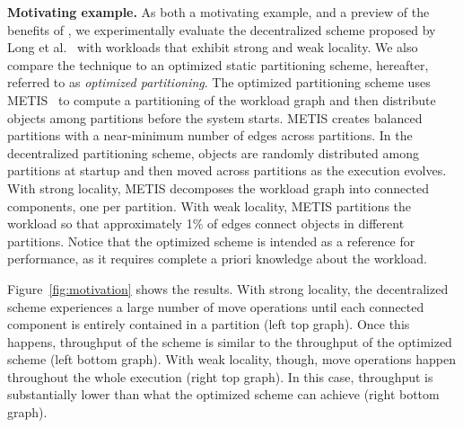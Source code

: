

\noindent
\textbf{Motivating example.}
As both a motivating example, and a preview of the benefits of
\dynastar, we experimentally evaluate the decentralized scheme
proposed by Long et al.~\cite{hoang2016} with workloads that exhibit
strong and weak locality.  We also compare the technique to an
optimized static partitioning scheme, hereafter, referred to as
\emph{optimized partitioning}.  The optimized partitioning scheme uses
METIS~\cite{Abou-Rjeili:2006} to compute a partitioning of the
workload graph and then distribute objects among partitions before the
system starts.  METIS creates balanced partitions with a near-minimum
number of edges across partitions.  In the decentralized partitioning
scheme, objects are randomly distributed among partitions at startup
and then moved across partitions as the execution evolves.  With
strong locality, METIS decomposes the workload graph into connected
components, one per partition.  With weak locality, METIS partitions
the workload so that approximately 1\% of edges connect objects in
different partitions.  Notice that the optimized scheme is intended as
a reference for performance, as it requires complete a priori
knowledge about the workload.

Figure~\ref{fig:motivation} shows the results.  With strong locality,
the decentralized scheme experiences a large number of move operations
until each connected component is entirely contained in a partition
(left top graph).  Once this happens, throughput of the scheme is
similar to the throughput of the optimized scheme (left bottom graph).
With weak locality, though, move operations happen throughout the
whole execution (right top graph).  In this case, throughput is
substantially lower than what the optimized scheme can achieve (right
bottom graph).








